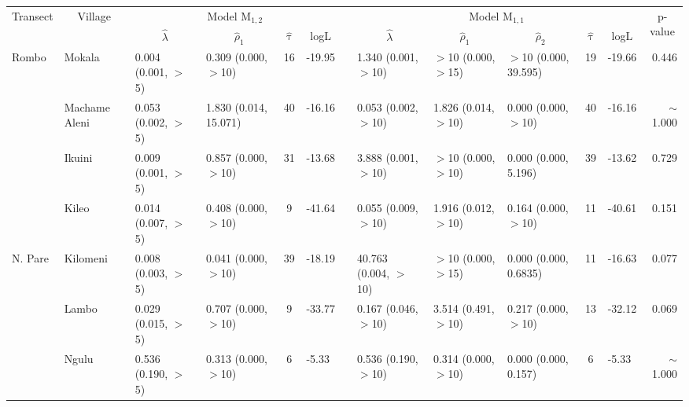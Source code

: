 \begin{tabular}{llllclllllclr} 
\toprule
\multicolumn{1}{c}{\multirow{2}{*}{Transect}} & \multicolumn{1}{c}{\multirow{2}{*}{Village}} & \multicolumn{4}{c}{Model M$_{1,2}$} & \multicolumn{1}{c}{} & \multicolumn{5}{c}{Model M$_{1,1}$} & \multicolumn{1}{c}{\multirow{2}{*}{p-value}}  \\ 
\cmidrule{3-6}\cmidrule{8-12}
\multicolumn{1}{c}{} & \multicolumn{1}{c}{} & \multicolumn{1}{c}{$\hat{\lambda}$} & \multicolumn{1}{c}{$\hat{\rho}_1$} & \multicolumn{1}{c}{$\hat{\uptau}$} & \multicolumn{1}{c}{logL} & \multicolumn{1}{c}{} & \multicolumn{1}{c}{$\hat{\lambda}$} & \multicolumn{1}{c}{$\hat{\rho}_1$} & \multicolumn{1}{c}{$\hat{\rho}_2$} & \multicolumn{1}{c}{$\hat{\uptau}$} & \multicolumn{1}{c}{logL} & \multicolumn{1}{c}{} \\ 
\midrule
Rombo       & Mokala         & 0.004 (0.001, $>$5)    & 0.309 (0.000, $>$10)   & 16   & -19.95   & & 1.340  (0.001, $>$10)   & $>$10  (0.000, $>$15)   & $>$10 (0.000, 39.595)  & 19  & -19.66   & 0.446\\
            & Machame Aleni  & 0.053 (0.002, $>$5)    & 1.830 (0.014, 15.071)  & 40   & -16.16   & & 0.053  (0.002, $>$10)   & 1.826  (0.014, $>$10)   & 0.000 (0.000, $>$10)   & 40  & -16.16   & $\sim$1.000\\
            & Ikuini         & 0.009 (0.001, $>$5)    & 0.857 (0.000, $>$10)   & 31   & -13.68   & & 3.888  (0.001, $>$10)   & $>$10  (0.000, $>$10)   & 0.000 (0.000, 5.196)   & 39  & -13.62   & 0.729\\
            & Kileo          & 0.014 (0.007, $>$5)    & 0.408 (0.000, $>$10)   & 9    & -41.64   & & 0.055  (0.009, $>$10)   & 1.916  (0.012, $>$10)   & 0.164 (0.000, $>$10)   & 11  & -40.61   & 0.151\\
\cmidrule{2-13}
N. Pare     & Kilomeni       & 0.008 (0.003, $>$5)    & 0.041 (0.000, $>$10)   & 39   & -18.19   & & 40.763 (0.004, $>$10)   & $>$10  (0.000, $>$15)   & 0.000 (0.000, 0.6835)  & 11  & -16.63   & 0.077\\
            & Lambo          & 0.029 (0.015, $>$5)    & 0.707 (0.000, $>$10)   & 9    & -33.77   & & 0.167  (0.046, $>$10)   & 3.514  (0.491, $>$10)   & 0.217 (0.000, $>$10)   & 13  & -32.12   & 0.069\\
            & Ngulu          & 0.536 (0.190, $>$5)    & 0.313 (0.000, $>$10)   & 6    & -5.33    & & 0.536  (0.190, $>$10)   & 0.314  (0.000, $>$10)   & 0.000 (0.000, 0.157)   & 6   & -5.33    & $\sim$1.000\\

\end{tabular}

